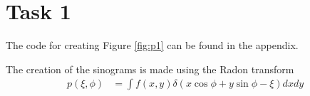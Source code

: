 \section{Task 1}
The code for creating Figure \ref{fig:p1} can be found in the appendix.


The creation of the sinograms is made using the Radon transform
\begin{align*}
    p(\xi,\phi) &= \int f(x,y) \delta(x\cos\phi + y\sin\phi - \xi) dx dy\\
\end{align*}